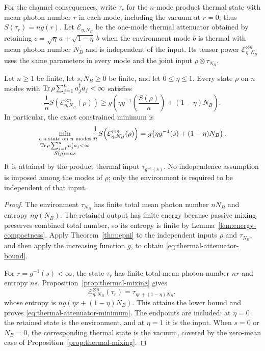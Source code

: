 For the channel consequences, write \(\tau_r\) for the \(n\)-mode product thermal state with mean photon number \(r\) in each mode, including the vacuum at \(r=0\); thus \(S(\tau_r)=ng(r)\). Let \(\mathcal E_{\eta,N_B}\) be the one-mode thermal attenuator obtained by retaining \(c=\sqrt\eta\,a+\sqrt{1-\eta}\,b\) when the environment mode \(b\) is thermal with mean photon number \(N_B\) and is independent of the input. Its tensor power \(\mathcal E_{\eta,N_B}^{\otimes n}\) uses the same parameters in every mode and the joint input \(\rho\otimes\tau_{N_B}\).

\begin{corollary}\label{cor:thermal-attenuator}
Let \(n\ge1\) be finite, let \(s,N_B\ge0\) be finite, and let \(0\le\eta\le1\). Every state \(\rho\) on \(n\) modes with
\(\operatorname{Tr}\rho\sum_{j=1}^n a_j^\dagger a_j<\infty\) satisfies
\begin{equation}\label{eq:thermal-attenuator-bound}
 \frac1n S\!\left(\mathcal E_{\eta,N_B}^{\otimes n}(\rho)\right)
 \ge g\!\left(\eta g^{-1}\!\left(\frac{S(\rho)}n\right)
                   +(1-\eta)N_B\right).
\end{equation}
In particular, the exact constrained minimum is
\begin{equation}\label{eq:thermal-attenuator-minimum}
 \min_{\substack{\rho\text{ a state on }n\text{ modes}\\
                  \operatorname{Tr}\rho\sum_{j=1}^n a_j^\dagger a_j<\infty\\
                  S(\rho)=ns}}
 \frac1n S\!\left(\mathcal E_{\eta,N_B}^{\otimes n}(\rho)\right)
 =g\!\left(\eta g^{-1}(s)+(1-\eta)N_B\right).
\end{equation}
It is attained by the product thermal input \(\tau_{g^{-1}(s)}\). No independence assumption is imposed among the modes of \(\rho\); only the environment is required to be independent of that input.
\end{corollary}
\begin{proof}
The environment \(\tau_{N_B}\) has finite total mean photon number \(nN_B\) and entropy \(ng(N_B)\). The retained output has finite energy because passive mixing preserves combined total number, so its entropy is finite by Lemma~\ref{lem:energy-compactness}. Apply Theorem~\ref{thm:epni} to the independent inputs \(\rho\) and \(\tau_{N_B}\), and then apply the increasing function \(g\), to obtain \eqref{eq:thermal-attenuator-bound}.

For \(r=g^{-1}(s)<\infty\), the state \(\tau_r\) has finite total mean photon number \(nr\) and entropy \(ns\). Proposition~\ref{prop:thermal-mixing} gives
\[
 \mathcal E_{\eta,N_B}^{\otimes n}(\tau_r)
 =\tau_{\eta r+(1-\eta)N_B},
\]
whose entropy is \(n g(\eta r+(1-\eta)N_B)\). This attains the lower bound and proves \eqref{eq:thermal-attenuator-minimum}. The endpoints are included: at \(\eta=0\) the retained state is the environment, and at \(\eta=1\) it is the input. When \(s=0\) or \(N_B=0\), the corresponding thermal state is the vacuum, covered by the zero-mean case of Proposition~\ref{prop:thermal-mixing}.
\end{proof}

